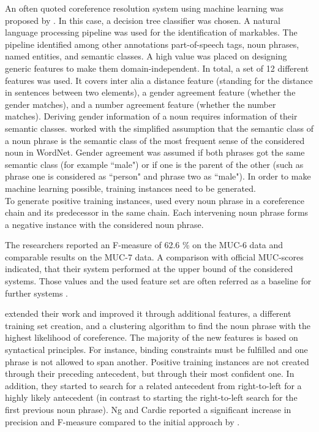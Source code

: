 An often quoted coreference resolution system using machine learning was proposed by \cite{soon2001machine}. In this case, a decision tree classifier was chosen. A natural language processing pipeline was used for the identification of markables. The pipeline identified among other annotations part-of-speech tags, noun phrases, named entities, and semantic classes. A high value was placed on designing generic features to make them domain-independent. In total, a set of 12 different features was used. It covers inter alia a distance feature (standing for the distance in sentences between two elements), a gender agreement feature (whether the gender matches), and a number agreement feature (whether the number matches). Deriving gender information of a noun requires information of their semantic classes. \cite{soon2001machine} worked with the simplified assumption that the semantic class of a noun phrase is the semantic class of the most frequent sense of the considered noun in WordNet. Gender agreement was assumed if both phrases got the same semantic class (for example “male") or if one is the parent of the other (such as phrase one is considered as “person" and phrase two as “male"). 
In order to make machine learning possible, training instances need to be generated.\\
To generate positive training instances, \cite{soon2001machine} used every noun phrase in a coreference chain and its predecessor in the same chain. Each intervening noun phrase forms a negative instance with the considered noun phrase. 

The researchers reported an F-measure of 62.6 \% on the MUC-6 data and comparable results on the MUC-7 data. A comparison with official MUC-scores indicated, that their system performed at the upper bound of the considered systems. Those values and the used feature set are often referred as a baseline for further systems \citep{versley2008bart}.

\citep{ng2002improving} extended their work and improved it through additional features, a different training set creation, and a clustering algorithm to find the noun phrase with the highest likelihood of coreference. The majority of the new features is based on syntactical principles. For instance, binding constraints must be fulfilled and one phrase is not allowed to span another. Positive training instances are not created through their preceding antecedent, but through their most confident one. In addition, they started to search for a related antecedent from right-to-left for a highly likely antecedent (in contrast to starting the right-to-left search for the first previous noun phrase). Ng and Cardie reported a significant increase in precision and F-measure compared to the initial approach by \citep{soon2001machine}.

